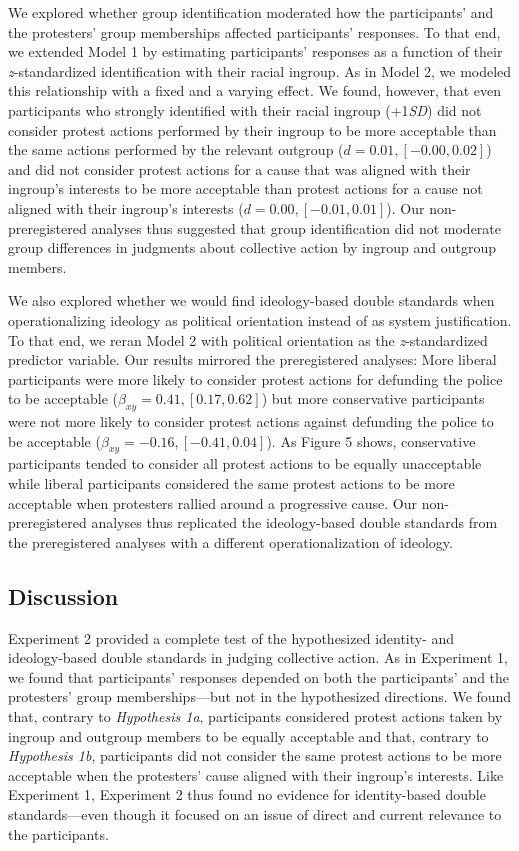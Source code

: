 \documentclass[12pt, letterpaper]{article}
\begin{document}
We explored whether group identification moderated how the participants'
and the protesters' group memberships affected participants' responses.
To that end, we extended Model 1 by estimating participants' responses
as a function of their \emph{z}-standardized identification with their
racial ingroup. As in Model 2, we modeled this relationship with a fixed
and a varying effect. We found, however, that even participants who
strongly identified with their racial ingroup (+1\emph{SD}) did not
consider protest actions performed by their ingroup to be more
acceptable than the same actions performed by the relevant outgroup
(\(d = 0.01, [-0.00, 0.02]\)) and did not consider protest actions for a
cause that was aligned with their ingroup's interests to be more
acceptable than protest actions for a cause not aligned with their
ingroup's interests (\(d = 0.00, [-0.01, 0.01]\)). Our non-preregistered
analyses thus suggested that group identification did not moderate group
differences in judgments about collective action by ingroup and outgroup
members.

We also explored whether we would find ideology-based double standards
when operationalizing ideology as political orientation instead of as
system justification. To that end, we reran Model 2 with political
orientation as the \emph{z}-standardized predictor variable. Our results
mirrored the preregistered analyses: More liberal participants were more
likely to consider protest actions for defunding the police to be
acceptable (\(\beta_{xy} = 0.41, [0.17, 0.62]\)) but more conservative
participants were not more likely to consider protest actions against
defunding the police to be acceptable
(\(\beta_{xy} = -0.16, [-0.41, 0.04]\)). As Figure 5 shows, conservative
participants tended to consider all protest actions to be equally
unacceptable while liberal participants considered the same protest
actions to be more acceptable when protesters rallied around a
progressive cause. Our non-preregistered analyses thus replicated the
ideology-based double standards from the preregistered analyses with a
different operationalization of ideology.

\hypertarget{discussion-1}{%
\subsection{Discussion}\label{discussion-1}}

Experiment 2 provided a complete test of the hypothesized identity- and
ideology-based double standards in judging collective action. As in
Experiment 1, we found that participants' responses depended on both the
participants' and the protesters' group memberships---but not in the
hypothesized directions. We found that, contrary to \emph{Hypothesis
1a}, participants considered protest actions taken by ingroup and
outgroup members to be equally acceptable and that, contrary to
\emph{Hypothesis 1b}, participants did not consider the same protest
actions to be more acceptable when the protesters' cause aligned with
their ingroup's interests. Like Experiment 1, Experiment 2 thus found no
evidence for identity-based double standards---even though it focused on
an issue of direct and current relevance to the participants.
\end{document}
